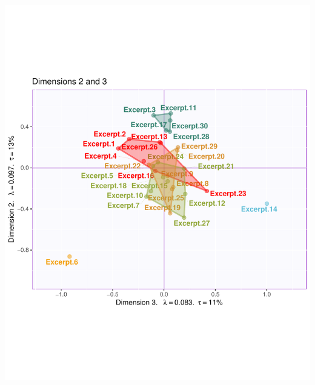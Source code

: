 \documentclass[
]{article}
\begin{document}
\begin{center}\includegraphics{MusDes_Supplementary_files/figure-latex/excerptsmaps23-2} \end{center}
\end{document}
